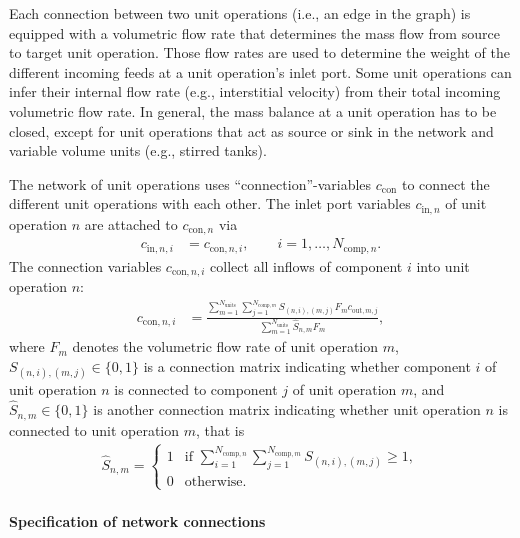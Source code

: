 Each connection between two unit operations (i.e., an edge in the graph) is equipped with a volumetric flow rate that determines the mass flow from source to target unit operation. 
Those flow rates are used to determine the weight of the different incoming feeds at a unit operation's inlet port.
Some unit operations can infer their internal flow rate (e.g., interstitial velocity) from their total incoming volumetric flow rate.
In general, the mass balance at a unit operation has to be closed, except for unit operations that act as source or sink in the network and variable volume units (e.g., stirred tanks).

The network of unit operations uses ``connection''-variables $c_{\text{con}}$ to connect the different unit operations with each other.
The inlet port variables $c_{\text{in},n}$ of unit operation $n$ are attached to $c_{\text{con},n}$ via 
\begin{align}
	c_{\text{in},n,i} &= c_{\text{con},n,i}, \qquad i = 1, \dots, N_{\text{comp},n}. \label{eq:NetworkInletConnection}
\end{align}
The connection variables $c_{\text{con},n,i}$ collect all inflows of component $i$ into unit operation $n$:
\begin{align}
	c_{\text{con},n,i} &= \frac{\sum_{m=1}^{N_{\text{units}}} \sum_{j = 1}^{N_{\text{comp},m}} S_{(n,i),(m,j)} F_m c_{\text{out},m,j}}{\sum_{m=1}^{N_{\text{units}}} \hat{S}_{n,m} F_m }, \label{eq:NetworkConnection}
\end{align}
where $F_m$ denotes the volumetric flow rate of unit operation $m$, $S_{(n,i),(m,j)} \in \{0, 1\}$ is a connection matrix indicating whether component $i$ of unit operation $n$ is connected to component $j$ of unit operation $m$, and $\hat{S}_{n,m} \in \{0, 1\}$ is another connection matrix indicating whether unit operation $n$ is connected to unit operation $m$, that is
\begin{align*}
	\hat{S}_{n,m} = \begin{cases}
		1 & \text{if } \sum_{i = 1}^{N_{\text{comp},n}} \sum_{j = 1}^{N_{\text{comp},m}} S_{(n,i),(m,j)} \geq 1, \\
		0 & \text{otherwise}.
	\end{cases}
\end{align*}

\paragraph{Specification of network connections}
\label{par:MUOPNetworkConfig}

